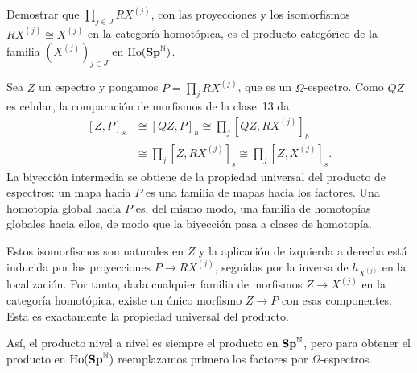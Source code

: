 \begin{ejer}\label{ejer:c14-producto-categorico}
Demostrar que $\prod_{j\in J}RX^{(j)}$, con las proyecciones y los isomorfismos $RX^{(j)}\cong X^{(j)}$ en la categoría homotópica, es el producto categórico de la familia $(X^{(j)})_{j\in J}$ en $\operatorname{Ho}(\mathbf{Sp}^{\mathbb N})$.
\end{ejer}
\begin{sol}
Sea $Z$ un espectro y pongamos $P=\prod_jRX^{(j)}$, que es un $\Omega$-espectro. Como $QZ$ es celular, la comparación de morfismos de la clase~13 da
\[
\begin{aligned}
[Z,P]_s&\cong[QZ,P]_h
\cong\prod_j[QZ,RX^{(j)}]_h\\
&\cong\prod_j[Z,RX^{(j)}]_s
\cong\prod_j[Z,X^{(j)}]_s.
\end{aligned}
\]
La biyección intermedia se obtiene de la propiedad universal del producto de espectros: un mapa hacia $P$ es una familia de mapas hacia los factores. Una homotopía global hacia $P$ es, del mismo modo, una familia de homotopías globales hacia ellos, de modo que la biyección pasa a clases de homotopía.

Estos isomorfismos son naturales en $Z$ y la aplicación de izquierda a derecha está inducida por las proyecciones $P\to RX^{(j)}$, seguidas por la inversa de $h_{X^{(j)}}$ en la localización. Por tanto, dada cualquier familia de morfismos $Z\to X^{(j)}$ en la categoría homotópica, existe un único morfismo $Z\to P$ con esas componentes. Esta es exactamente la propiedad universal del producto.
\end{sol}

Así, el producto nivel a nivel es siempre el producto en $\mathbf{Sp}^{\mathbb N}$, pero para obtener el producto en $\operatorname{Ho}(\mathbf{Sp}^{\mathbb N})$ reemplazamos primero los factores por $\Omega$-espectros.
